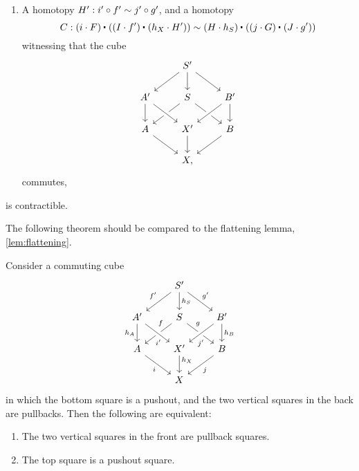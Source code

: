 \begin{cor}
\begin{enumerate}
\item A homotopy $H':i'\circ f'\sim j'\circ g'$, and a homotopy
\begin{equation*}
C : \ct{(i\cdot F)}{(\ct{(I\cdot f')}{(h_X\cdot H')})} \htpy \ct{(H\cdot h_S)}{(\ct{(j\cdot G)}{(J\cdot g')})}
\end{equation*}
witnessing that the cube
\begin{equation*}
\begin{tikzcd}
& S' \arrow[dl] \arrow[dr] \arrow[d] \\
A' \arrow[d] & S \arrow[dl] \arrow[dr] & B' \arrow[dl,crossing over] \arrow[d] \\
A \arrow[dr] & X' \arrow[d] \arrow[from=ul,crossing over] & B \arrow[dl] \\
& X,
\end{tikzcd}
\end{equation*}
commutes,
\end{enumerate}
is contractible.
\end{cor}

The following theorem should be compared to the flattening lemma, \cref{lem:flattening}.

\begin{thm}\label{cor:descent}
Consider a commuting cube
\begin{equation*}
\begin{tikzcd}
& S' \arrow[dl,swap,"{f'}"] \arrow[dr,"{g'}"] \arrow[d,"h_S"] \\
A' \arrow[d,swap,"h_A"] & S \arrow[dl,swap,"f" near start] \arrow[dr,"g" near start] & B' \arrow[dl,crossing over,"{j'}" near end] \arrow[d,"h_B"] \\
A \arrow[dr,swap,"i"] & X' \arrow[d,"h_X" near start] \arrow[from=ul,crossing over,"{i'}"' near end] & B \arrow[dl,"j"] \\
& X
\end{tikzcd}
\end{equation*}
in which the bottom square is a pushout, and the two vertical squares in the back are pullbacks. Then the following are equivalent:
\begin{enumerate}
\item The two vertical squares in the front are pullback squares.
\item The top square is a pushout square.
\end{enumerate}
\end{thm}

